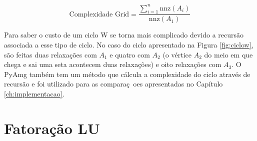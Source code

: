 \begin{equation}\label{eq:complexidadegrid}
    \text{Complexidade Grid} = \frac{\sum_{i=1}^n \text{nnz}(A_i)}{\text{nnz}(A_1)}
\end{equation}

Para saber o custo de um ciclo W se torna mais complicado devido a recursão associada a esse tipo de ciclo. No caso do ciclo apresentado na Figura \ref{fig:ciclow}, são feitas duas relaxações com $A_1$ e quatro com $A_2$ (o vértice $A_2$ do meio em que chega e sai uma seta acontecem duas relaxações) e oito relaxações com $A_3$. O PyAmg também tem um método que cálcula a complexidade do ciclo através de recursão e foi utilizado para as comparaç~oes apresentadas no Capítulo \ref{ch:implementacao}. 







\section{Fatoração LU} \label{sec:fatoracaolu}

